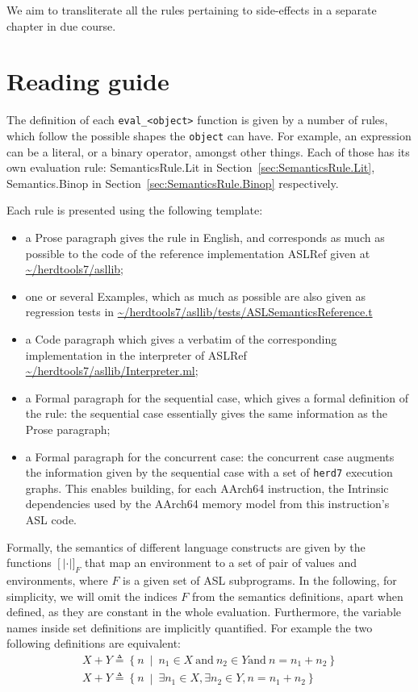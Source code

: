 \documentclass{book}
\newcommand\llbracket{[|}
\newcommand\rrbracket{|]}
\newcommand\interp[1]{\left\llbracket #1 \right\rrbracket}
\newcommand\st[0]{\ \middle|\ }
\begin{document}
We aim to transliterate all the rules pertaining to side-effects in a separate
chapter in due course.

\chapter{Reading guide}

The definition of each \texttt{eval\_<object>} function is given by a number of
rules, which follow the possible shapes the \texttt{object} can have. For
example, an expression can be a literal, or a binary operator, amongst other
things. Each of those has its own evaluation rule: SemanticsRule.Lit in
Section~\ref{sec:SemanticsRule.Lit}, Semantics.Binop in
Section~\ref{sec:SemanticsRule.Binop} respectively.

Each rule is presented using the following template:
\begin{itemize}
\item a Prose paragraph gives the rule in English, and corresponds as much as possible to the code of the reference implementation ASLRef given at \url{~/herdtools7/asllib};
\item one or several Examples, which as much as possible are also given as regression tests in \url{~/herdtools7/asllib/tests/ASLSemanticsReference.t} 
\item a Code paragraph which gives a verbatim of the corresponding implementation in the interpreter of ASLRef \url{~/herdtools7/asllib/Interpreter.ml};
\item a Formal paragraph for the sequential case, which gives a formal
definition of the rule: the sequential case essentially gives the same
information as the Prose paragraph;
\item a Formal paragraph for the concurrent case: the concurrent case augments
the information given by the sequential case with a set of \texttt{herd7}
execution graphs. This enables building, for each AArch64 instruction, the
Intrinsic dependencies used by the AArch64 memory model from this instruction's
ASL code.
\end{itemize}
%
Formally, the semantics of different language constructs are given by the functions
$\interp{\cdot}_F$ that map an environment to a set of pair of values and
environments, where $F$ is a given set of ASL subprograms.
%
In the following, for simplicity, we will omit the indices $F$ from the
semantics definitions, apart when defined, as they are constant in the whole
evaluation.
%
Furthermore, the variable names inside set definitions are implicitly
quantified. For example the two following definitions are equivalent:
%
\begin{gather*}
  X + Y \triangleq \left\{ n \st{} n_1 \in X \ \text{and}\ n_2 \in Y \text{and}\ n = n_1 + n_2 \right\}
  \\
  X + Y \triangleq \left\{ n \st{} \exists n_1 \in X, \exists n_2 \in Y, n = n_1 + n_2 \right\}
\end{gather*}
\end{document}
